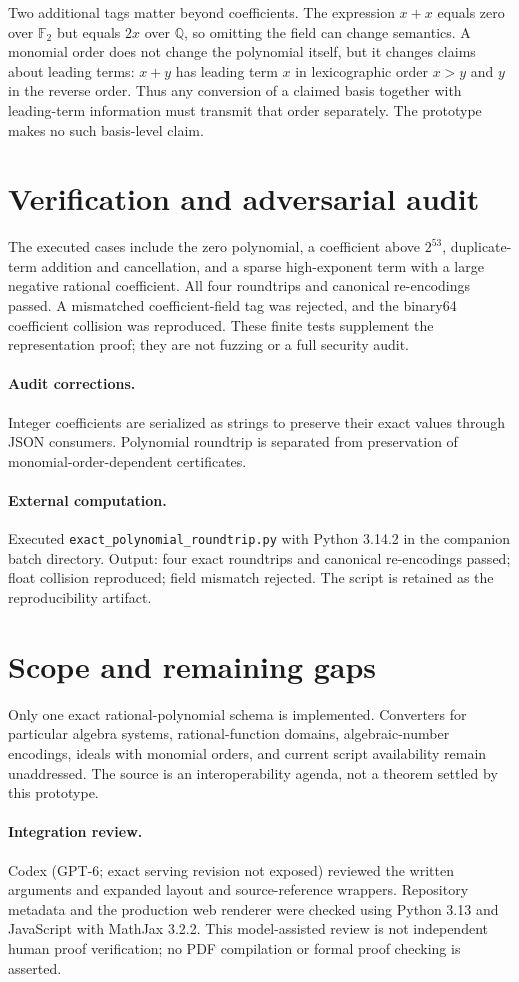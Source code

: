\documentclass[11pt]{article}
\begin{document}
Two additional tags matter beyond coefficients. The expression $x+x$ equals zero over $\mathbb F_2$ but equals $2x$ over $\mathbb Q$, so omitting the field can change semantics. A monomial order does not change the polynomial itself, but it changes claims about leading terms: $x+y$ has leading term $x$ in lexicographic order $x>y$ and $y$ in the reverse order. Thus any conversion of a claimed basis together with leading-term information must transmit that order separately. The prototype makes no such basis-level claim.
\section{Verification and adversarial audit}
The executed cases include the zero polynomial, a coefficient above $2^{53}$, duplicate-term addition and cancellation, and a sparse high-exponent term with a large negative rational coefficient. All four roundtrips and canonical re-encodings passed. A mismatched coefficient-field tag was rejected, and the binary64 coefficient collision was reproduced. These finite tests supplement the representation proof; they are not fuzzing or a full security audit.
\paragraph{Audit corrections.} Integer coefficients are serialized as strings to preserve their exact values through JSON consumers. Polynomial roundtrip is separated from preservation of monomial-order-dependent certificates.
\paragraph{External computation.} Executed \texttt{exact\_polynomial\_roundtrip.py} with Python 3.14.2 in the companion batch directory. Output: four exact roundtrips and canonical re-encodings passed; float collision reproduced; field mismatch rejected. The script is retained as the reproducibility artifact.
\section{Scope and remaining gaps}
Only one exact rational-polynomial schema is implemented. Converters for particular algebra systems, rational-function domains, algebraic-number encodings, ideals with monomial orders, and current script availability remain unaddressed. The source is an interoperability agenda, not a theorem settled by this prototype.
\paragraph{Integration review.} Codex (GPT-6; exact serving revision not exposed) reviewed the written arguments and expanded layout and source-reference wrappers. Repository metadata and the production web renderer were checked using Python 3.13 and JavaScript with MathJax 3.2.2. This model-assisted review is not independent human proof verification; no PDF compilation or formal proof checking is asserted.
\end{document}
